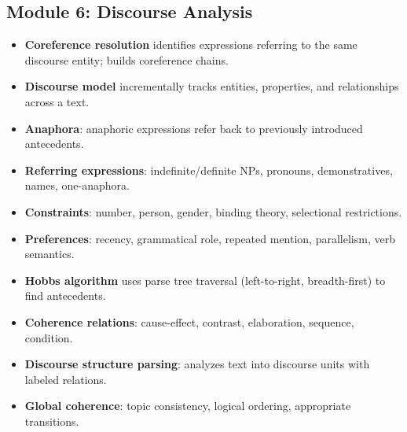 \documentclass[11pt,a4paper]{article}
\begin{document}
\subsection{Module 6: Discourse Analysis}
\begin{itemize}
    \item \textbf{Coreference resolution} identifies expressions referring to the same discourse entity; builds coreference chains.
    \item \textbf{Discourse model} incrementally tracks entities, properties, and relationships across a text.
    \item \textbf{Anaphora}: anaphoric expressions refer back to previously introduced antecedents.
    \item \textbf{Referring expressions}: indefinite/definite NPs, pronouns, demonstratives, names, one-anaphora.
    \item \textbf{Constraints}: number, person, gender, binding theory, selectional restrictions.
    \item \textbf{Preferences}: recency, grammatical role, repeated mention, parallelism, verb semantics.
    \item \textbf{Hobbs algorithm} uses parse tree traversal (left-to-right, breadth-first) to find antecedents.
    \item \textbf{Coherence relations}: cause-effect, contrast, elaboration, sequence, condition.
    \item \textbf{Discourse structure parsing}: analyzes text into discourse units with labeled relations.
    \item \textbf{Global coherence}: topic consistency, logical ordering, appropriate transitions.
\end{itemize}
\end{document}
